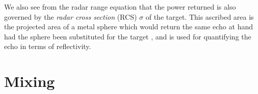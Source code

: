 We also see from the radar range equation that the power returned is also governed by the \emph{radar cross section} (RCS) $\sigma$ of the target. This ascribed area is the projected area of a metal sphere which would return the same echo at hand had the sphere been substituted for the target \citep{skolnik_2009}, and is used for quantifying the echo in terms of reflectivity.  












\section{Mixing}


